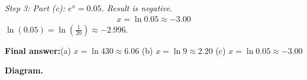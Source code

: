 \documentclass[11pt]{article}
\begin{document}
\textit{Step 3: Part (c): \( e^x = 0.05 \). Result is negative.}
\[\begin{gathered}
x = \ln 0.05 \approx -3.00
\end{gathered}\]
\( \ln(0.05) = \ln(\frac{1}{20}) \approx -2.996 \).

\begin{answerbox}
\textbf{Final answer:}\quad (a) \(\displaystyle  x = \ln 430 \approx 6.06 \) \quad  (b) \(\displaystyle  x = \ln 9 \approx 2.20 \) \quad  (c) \(\displaystyle  x = \ln 0.05 \approx -3.00 \)
\end{answerbox}
\textbf{Diagram.}

\begin{center}
\end{center}
\end{document}
